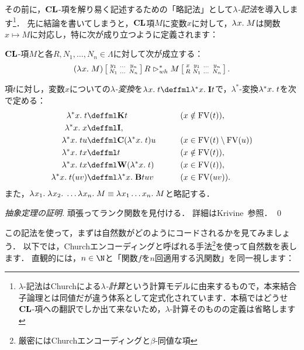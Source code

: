 \documentclass[realisability.tex]{subfiles}
\begin{document}
その前に，$\CL$-項を解り易く記述するための「略記法」として\emph{$\lambda$-記法}を導入します\footnote{$\lambda$-記法はChurchによる\emph{$\lambda$-計算}という計算モデルに由来するもので，本来結合子論理とは同値だが違う体系として定式化されています．本稿ではどうせ$\CL$-項への翻訳でしか出て来ないため，$\lambda$-計算そのものの定義は省略します}．
先に結論を書いてしまうと，$\CL$項$M$に変数$x$に対して，$\abs x M$は関数$x \mapsto M$に対応し，特に次が成り立つように定義されます：

\begin{theorem}[抽象定理]\label{thm:abs-thm-cl}
 $\CL$-項$M$と各$R, N_1, \dots, N_n \in \Lambda$に対して次が成立する：
 \[
  (\abs x M)\subst{y_1 & \dots& y_n\\ N_1& \dots & N_n } R \reds_{wh}^*
  M\subst{x & y_1 & \dots& y_n\\ R & N_1 & \dots &N_n }.
 \]
\end{theorem}

\begin{definition}
 項$t$に対し，変数$x$についての\emph{$\lambda$-変換}を$\abs{x}{t} \deffml \abs[*]{x}{\I t}$で，$\lambda^*$-変換$\abs[*]{x}{t}$を次で定める：
 \begin{alignat}{2}
  \abs[*] x t       &\deffml \K t &\qquad &(x \notin \FV(t)),\label{eq:lam-K}\\
  \abs[*] x x       &\deffml \I,\label{eq:lam-var}\\
  \abs[*]{x}{t u}     &\deffml \C(\abs[*] x t) u && (x \in \FV(t) \setminus \FV(u))\label{eq:lam-head}\\
  \abs[*]{x}{t x}     &\deffml t && (x \notin \FV(t)),\label{eq:lam-tail}\\
  \abs[*]{x}{t x}     & \deffml \W(\abs[*] x t) && (x \in \FV(t)),\label{eq:lam-both-var}\\
  \abs[*]{x}{t (u v)} & \deffml \abs[*] x {\B t u v} && (x \in \FV(uv))\label{eq:lam-app-app}.
 \end{alignat}
 また，$\abs{x_1}{\abs{x_2}{ \dots \abs{x_n} M}} \equiv \abs{x_1 \dots x_n} M$と略記する．
\end{definition}

\begin{proof}[抽象定理の証明]
 頑張ってランク関数を見付ける．
 詳細はKrivine~\cite{Krivine:2016if}参照． \qed
\end{proof}

この記法を使って，まずは自然数がどのようにコードされるかを見てみましょう．
以下では，Churchエンコーディングと呼ばれる手法\footnote{厳密にはChurchエンコーディングと$\beta$-同値な項}を使って自然数を表します．
直観的には，$n \in \N$と「関数$f$を$n$回適用する汎関数」を同一視します：
\end{document}
